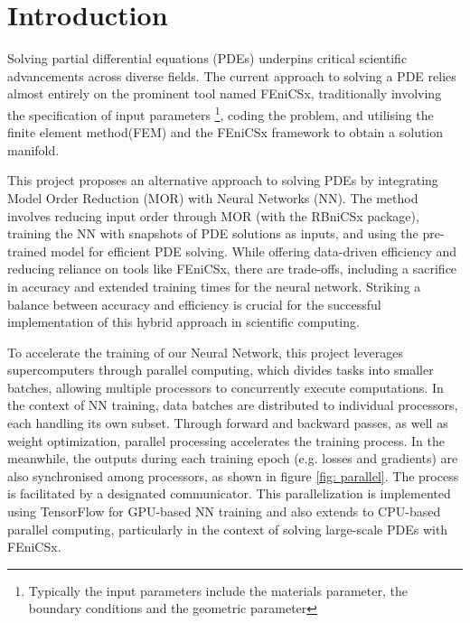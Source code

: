 \section{Introduction}

Solving partial differential equations (PDEs) underpins critical scientific advancements across diverse fields. The current approach to solving a PDE relies almost entirely on the prominent tool named FEniCSx, traditionally involving the specification of input parameters \footnote{Typically the input parameters include the materials parameter, the boundary conditions and the geometric parameter}, coding the problem, and utilising the finite element method(FEM) and the FEniCSx framework to obtain a solution manifold. 

This project proposes an alternative approach to solving PDEs by integrating Model Order Reduction (MOR) with Neural Networks (NN). The method involves reducing input order through MOR (with the RBniCSx package), training the NN with snapshots of PDE solutions as inputs, and using the pre-trained model for efficient PDE solving. While offering data-driven efficiency and reducing reliance on tools like FEniCSx, there are trade-offs, including a sacrifice in accuracy and extended training times for the neural network. Striking a balance between accuracy and efficiency is crucial for the successful implementation of this hybrid approach in scientific computing.

To accelerate the training of our Neural Network, this project leverages supercomputers through parallel computing, which divides tasks into smaller batches, allowing multiple processors to concurrently execute computations. In the context of NN training, data batches are distributed to individual processors, each handling its own subset. Through forward and backward passes, as well as weight optimization, parallel processing accelerates the training process. In the meanwhile, the outputs during each training epoch (e.g. losses and gradients) are also synchronised among processors, as shown in figure \ref{fig: parallel}. The process is facilitated by a designated communicator. This parallelization is implemented using TensorFlow for GPU-based NN training and also extends to CPU-based parallel computing, particularly in the context of solving large-scale PDEs with FEniCSx.

